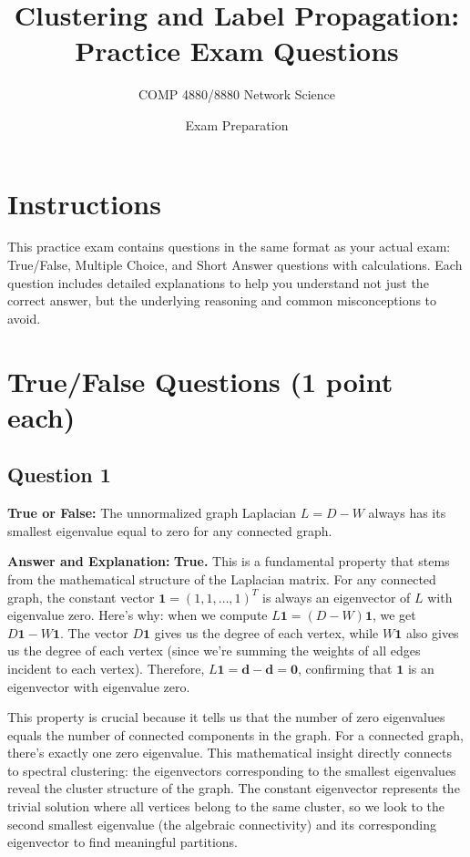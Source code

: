 \documentclass[11pt]{article}
\title{Clustering and Label Propagation: Practice Exam Questions}
\author{COMP 4880/8880 Network Science}
\date{Exam Preparation}
\newenvironment{answer}{\color{answercolor}\begin{framed}\textbf{Answer and Explanation:}}{\end{framed}}
\begin{document}
\maketitle

\section*{Instructions}
This practice exam contains questions in the same format as your actual exam: True/False, Multiple Choice, and Short Answer questions with calculations. Each question includes detailed explanations to help you understand not just the correct answer, but the underlying reasoning and common misconceptions to avoid.

\section{True/False Questions (1 point each)}

\subsection{Question 1}
\textbf{True or False:} The unnormalized graph Laplacian $L = D - W$ always has its smallest eigenvalue equal to zero for any connected graph.

\begin{answer}
\textbf{True.} This is a fundamental property that stems from the mathematical structure of the Laplacian matrix. For any connected graph, the constant vector $\mathbf{1} = (1, 1, \ldots, 1)^T$ is always an eigenvector of $L$ with eigenvalue zero. Here's why: when we compute $L\mathbf{1} = (D - W)\mathbf{1}$, we get $D\mathbf{1} - W\mathbf{1}$. The vector $D\mathbf{1}$ gives us the degree of each vertex, while $W\mathbf{1}$ also gives us the degree of each vertex (since we're summing the weights of all edges incident to each vertex). Therefore, $L\mathbf{1} = \mathbf{d} - \mathbf{d} = \mathbf{0}$, confirming that $\mathbf{1}$ is an eigenvector with eigenvalue zero.

This property is crucial because it tells us that the number of zero eigenvalues equals the number of connected components in the graph. For a connected graph, there's exactly one zero eigenvalue. This mathematical insight directly connects to spectral clustering: the eigenvectors corresponding to the smallest eigenvalues reveal the cluster structure of the graph. The constant eigenvector represents the trivial solution where all vertices belong to the same cluster, so we look to the second smallest eigenvalue (the algebraic connectivity) and its corresponding eigenvector to find meaningful partitions.
\end{answer}
\end{document}
